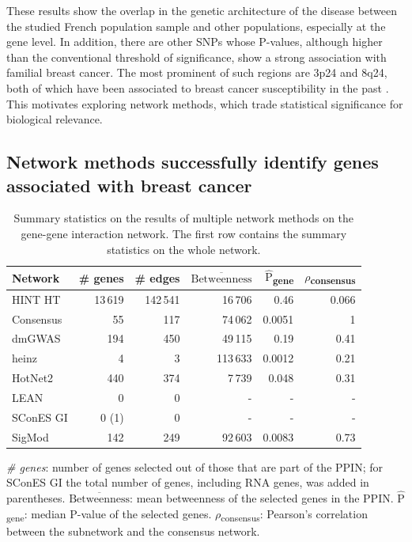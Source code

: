 \documentclass[twocolumn, 10pt]{article}
\newcommand{\mean}[1]{$\overline{\mbox{#1}}$}
\newcommand{\median}[1]{$\hat{\mbox{#1}}$}
\begin{document}
These results show the overlap in the genetic architecture of the disease between the studied French population sample and other populations, especially at the gene level. In addition, there are other SNPs whose P-values, although higher than the conventional threshold of significance, show a strong association with familial breast cancer. The most prominent of such regions are 3p24 and 8q24, both of which have been associated to breast cancer susceptibility in the past \cite{brisbin_meta-analysis_2011,search_newly_2009}. This motivates exploring network methods, which trade statistical significance for biological relevance.

\subsection{Network methods successfully identify genes associated with breast cancer}
\label{results:separate_networks}
\begin{table}[htbp]
  \begin{threeparttable}
\caption{\label{tab:gene_solutions}
Summary statistics on the results of multiple network methods on the gene-gene interaction network. The first row contains the summary statistics on the whole network.}
\centering
\begin{tabular}{lrrrrr}
Network & \# genes & \# edges & \mean{Betweenness} & \median{P}\textsubscript{gene} & \(\rho\)\textsubscript{consensus}\\
\hline
HINT HT & 13\,619 & 142\,541 & 16\,706 & 0.46 & 0.066\\
\hline
Consensus & 55 & 117 & 74\,062 & 0.0051 & 1\\
dmGWAS & 194 & 450 & 49\,115 & 0.19 & 0.41\\
heinz & 4 & 3 & 113\,633 & 0.0012 & 0.21\\
HotNet2 & 440 & 374 & 7\,739 & 0.048 & 0.31\\
LEAN & 0 & 0 & - & - & -\\
SConES GI & 0 (1) & 0 & - & - & -\\
SigMod & 142 & 249 & 92\,603 & 0.0083 & 0.73\\
\end{tabular}
\begin{tablenotes}
\emph{\# genes}: number of genes selected out of those that are part of the PPIN; for SConES GI the total number of genes, including RNA genes, was added in parentheses. \mean{Betweenness}: mean betweenness of the selected genes in the PPIN. \median{P}\textsubscript{gene}: median P-value of the selected genes. \(\rho\)\textsubscript{consensus}: Pearson's correlation between the subnetwork and the consensus network.
\end{tablenotes}
\end{threeparttable}
\end{table}
\end{document}
